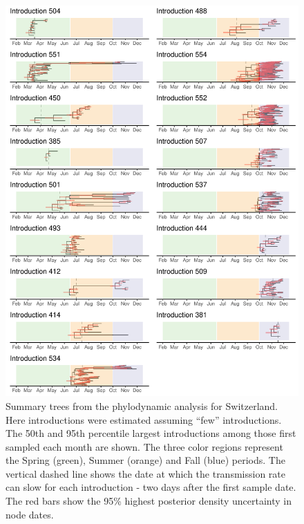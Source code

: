 \documentclass[9pt,twoside,lineno]{pnas-new}
\begin{document}
\begin{figure}[tbhp]
\centering
\includegraphics[width=0.75\linewidth]{figures/Re_skyline.min_chains.sampUB1.0.ctEst1.summary_trees.pdf}
\caption{Summary trees from the phylodynamic analysis for Switzerland. Here introductions were estimated assuming ``few'' introductions. The 50th and 95th percentile largest introductions among those first sampled each month are shown. The three color regions represent the Spring (green), Summer (orange) and Fall (blue) periods. The vertical dashed line shows the date at which the transmission rate can slow for each introduction - two days after the first sample date. The red bars show the 95\% highest posterior density uncertainty in node dates.}  
\label{fig:logged-chains-min}
\end{figure}
\newpage
\end{document}
